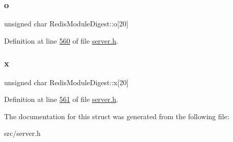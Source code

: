 \subsubsection{\texorpdfstring{o}{o}}
{\footnotesize\ttfamily unsigned char Redis\+Module\+Digest\+::o\mbox{[}20\mbox{]}}



Definition at line \hyperlink{server_8h_source_l00560}{560} of file \hyperlink{server_8h_source}{server.\+h}.

\mbox{\label{structRedisModuleDigest_a1ccfc1f6709218f9bbeacd8b0d2dbd5e}} 
\subsubsection{\texorpdfstring{x}{x}}
{\footnotesize\ttfamily unsigned char Redis\+Module\+Digest\+::x\mbox{[}20\mbox{]}}



Definition at line \hyperlink{server_8h_source_l00561}{561} of file \hyperlink{server_8h_source}{server.\+h}.



The documentation for this struct was generated from the following file\+:\begin{DoxyCompactItemize}
\item 
src/server.\+h\end{DoxyCompactItemize}

